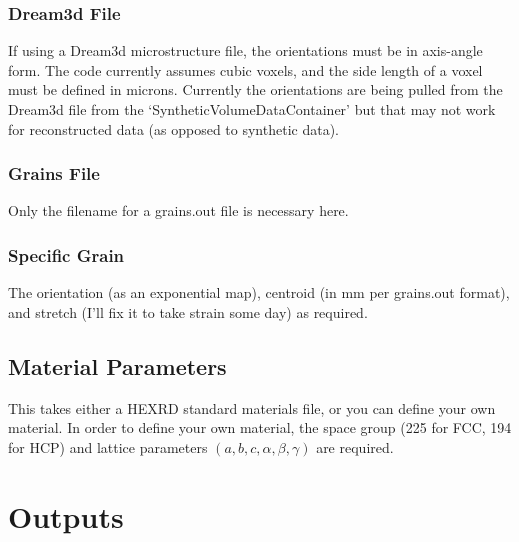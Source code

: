 \documentclass[12pt]{article}
\begin{document}
		\subsubsection{Dream3d File}
		If using a Dream3d microstructure file, the orientations must be in axis-angle form. The code currently assumes cubic voxels, and the side length of a voxel must be defined in microns. Currently the orientations are being pulled from the Dream3d file from the `SyntheticVolumeDataContainer' but that may not work for reconstructed data (as opposed to synthetic data).
		
		\subsubsection{Grains File}
		Only the filename for a grains.out file is necessary here.
		
		\subsubsection{Specific Grain}
		The orientation (as an exponential map), centroid (in mm per grains.out format), and stretch (I'll fix it to take strain some day) as required. 

	
	\subsection{Material Parameters} \label{sec:material}
	This takes either a HEXRD standard materials file, or you can define your own material. In order to define your own material, the space group (225 for FCC, 194 for HCP) and lattice parameters $(a, b, c, \alpha, \beta, \gamma)$ are required.

\section{Outputs}
	
\end{document}
